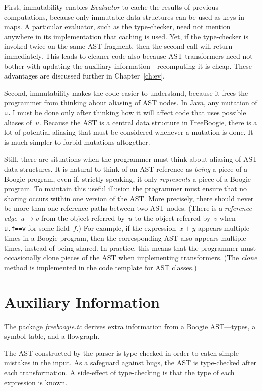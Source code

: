 \documentclass[a4paper]{article}
\newcommand{\jmlCode}{\lstinline[style=jml,basicstyle=\normalsize]}
\theoremstyle{slanted}
\theoremstyle{definition}
\theoremstyle{remark}
\begin{document}
First, immutability enables \textit{Evaluator} to cache the
results of previous computations, because only immutable data
structures can be used as keys in maps. A particular evaluator,
such as the type-checker, need not mention anywhere in its
implementation that caching is used. Yet, if the type-checker
is invoked twice on the same AST fragment, then the second call
will return immediately. This leads to cleaner code also because
AST transformers need not bother with updating the auxiliary
information---recomputing it is cheap. These advantages are
discussed further in Chapter~\ref{ch:ev}.

Second, immutability makes the code easier to understand, because
it frees the programmer from thinking about aliasing of AST nodes.
In Java, any mutation of \jmlCode|u.f| must be done only after
thinking how it will affect code that uses possible aliases of~$u$.
Because the AST is a central data structure in FreeBoogie, there
is a lot of potential aliasing that must be considered whenever
a mutation is done. It is much simpler to forbid mutations altogether.

Still, there are situations when the programmer must think about
aliasing of AST data structures. It is natural to think of an
AST reference as \emph{being} a piece of a Boogie program,
even if, strictly speaking, it only \emph{represents} a piece
of a Boogie program. To maintain this useful illusion the
programmer must ensure that no sharing occurs within one version
of the AST\null. More precisely, there should never be more
than one reference-paths between two AST nodes. (There is a
\emph{reference-edge}~$u\to v$ from the object referred by~$u$
to the object referred by~$v$ when \jmlCode|u.f==v| for some
field~$f$.) For example, if the expression~$x+y$ appears multiple
times in a Boogie program, then the corresponding AST also
appears multiple times, instead of being shared. In practice,
this means that the programmer must occasionally clone pieces
of the AST when implementing transformers. (The \textit{clone}
method is implemented in the code template for AST classes.)

\section{Auxiliary Information}

The package \textit{freeboogie.tc} derives extra information from
a Boogie AST---types, a symbol table, and a flowgraph.

The AST constructed by the parser is type-checked in order to
catch simple mistakes in the input. As a safeguard against bugs,
the AST is type-checked after each transformation. A side-effect
of type-checking is that the type of each expression is known.
\end{document}
